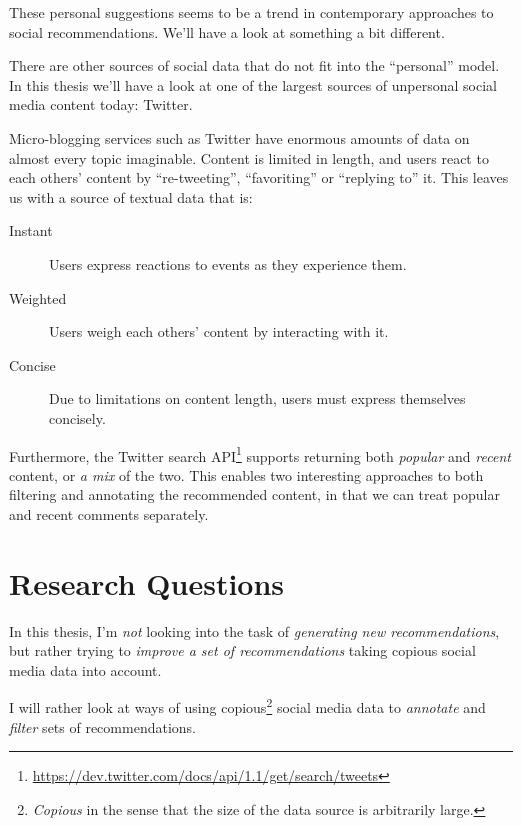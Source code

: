 These personal suggestions seems to be a trend in contemporary approaches to social recommendations.
We'll have a look at something a bit different.


There are other sources of social data that do not fit into the ``personal'' model.
In this thesis we'll have a look at one of the largest sources of unpersonal social media content today: Twitter.

Micro-blogging services such as Twitter have enormous amounts of data on almost every topic imaginable.
Content is limited in length, and users react to each others' content by ``re-tweeting'', ``favoriting'' or ``replying to'' it.
This leaves us with a source of textual data that is:

\begin{description}
  \item[Instant] Users express reactions to events as they experience them.
  \item[Weighted] Users weigh each others' content by interacting with it.
  \item[Concise] Due to limitations on content length, users must express themselves concisely.
\end{description}

Furthermore, the Twitter search API\footnote{\url{https://dev.twitter.com/docs/api/1.1/get/search/tweets}} supports returning both \emph{popular} and \emph{recent} content, or \emph{a mix} of the two.
This enables two interesting approaches to both filtering and annotating the recommended content, in that we can treat popular and recent comments separately.


\section{Research Questions}

In this thesis, I'm \emph{not} looking into the task of \emph{generating new recommendations}, but rather trying to \emph{improve a set of recommendations} taking copious social media data into account.

I will rather look at ways of using copious\footnote{\emph{Copious} in the sense that the size of the data source is arbitrarily large.} social media data to \emph{annotate} and \emph{filter} sets of recommendations.


